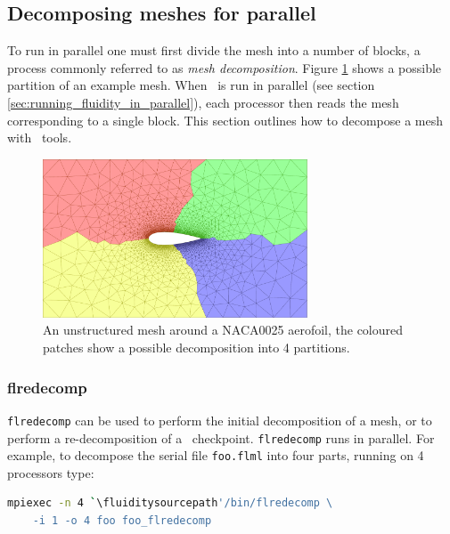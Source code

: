 \subsection{Decomposing meshes for parallel}
\label{decomp_meshes_parallel}
To run in parallel one must first divide the mesh into a number of blocks, a process
commonly referred to as \emph{mesh decomposition}. Figure \ref{fig:NACA0025_mesh_with_partitions}
shows a possible partition of an example mesh. When \fluidity\ is run in parallel (see section
\ref{sec:running_fluidity_in_parallel}), each processor then reads the mesh corresponding to a
single block. This section outlines how to decompose a mesh with \fluidity\ tools.
\begin{figure}[htbp]
 \centering
  \includegraphics[width=0.7\textwidth]{misc_images/NACA0025_mesh_with_partitions.pdf}
  \caption{An unstructured mesh around a NACA0025 aerofoil, the coloured patches show a
           possible decomposition into 4 partitions.}
  \label{fig:NACA0025_mesh_with_partitions}
\end{figure}

\subsubsection{flredecomp}
\label{mesh!meshing tools!flredecomp}
\lstinline[language=bash]+flredecomp+ can be used to perform the initial decomposition of a mesh, or to perform a re-decomposition of a \fluidity\ checkpoint. \lstinline[language=bash]+flredecomp+ runs in parallel. 
For example, to decompose the serial file \lstinline+foo.flml+
into four parts, running on 4 processors type:

\begin{lstlisting}[language=bash]
mpiexec -n 4 `\fluiditysourcepath'/bin/flredecomp \
    -i 1 -o 4 foo foo_flredecomp
\end{lstlisting}

